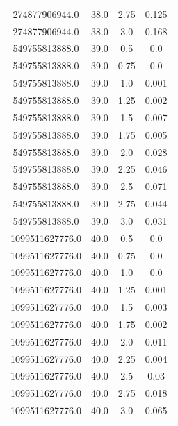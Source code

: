 \begin{tabular}{|c|c|c|c|}
274877906944.0 & 38.0 & 2.75 & 0.125 \\ 
274877906944.0 & 38.0 & 3.0 & 0.168 \\ 
549755813888.0 & 39.0 & 0.5 & 0.0 \\ 
549755813888.0 & 39.0 & 0.75 & 0.0 \\ 
549755813888.0 & 39.0 & 1.0 & 0.001 \\ 
549755813888.0 & 39.0 & 1.25 & 0.002 \\ 
549755813888.0 & 39.0 & 1.5 & 0.007 \\ 
549755813888.0 & 39.0 & 1.75 & 0.005 \\ 
549755813888.0 & 39.0 & 2.0 & 0.028 \\ 
549755813888.0 & 39.0 & 2.25 & 0.046 \\ 
549755813888.0 & 39.0 & 2.5 & 0.071 \\ 
549755813888.0 & 39.0 & 2.75 & 0.044 \\ 
549755813888.0 & 39.0 & 3.0 & 0.031 \\ 
1099511627776.0 & 40.0 & 0.5 & 0.0 \\ 
1099511627776.0 & 40.0 & 0.75 & 0.0 \\ 
1099511627776.0 & 40.0 & 1.0 & 0.0 \\ 
1099511627776.0 & 40.0 & 1.25 & 0.001 \\ 
1099511627776.0 & 40.0 & 1.5 & 0.003 \\ 
1099511627776.0 & 40.0 & 1.75 & 0.002 \\ 
1099511627776.0 & 40.0 & 2.0 & 0.011 \\ 
1099511627776.0 & 40.0 & 2.25 & 0.004 \\ 
1099511627776.0 & 40.0 & 2.5 & 0.03 \\ 
1099511627776.0 & 40.0 & 2.75 & 0.018 \\ 
1099511627776.0 & 40.0 & 3.0 & 0.065 \\ 
\hline
\end{tabular}
